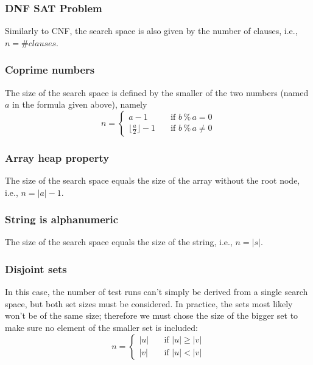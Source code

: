 \documentclass{article}
\begin{document}
\subsubsection{DNF SAT Problem}
Similarly to CNF, the search space is also given by the number of clauses, i.e., $n = \#clauses$.

\subsubsection{Coprime numbers}
The size of the search space is defined by the smaller of the two numbers (named $a$ in the formula given above), namely
\begin{equation*}
    n =
    \begin{cases}
    a - 1 & \quad \text{if } b\mathbin{\%}a = 0\\
    \lfloor \frac{a}{2} \rfloor -1 & \quad \text{if } b\mathbin{\%}a \neq 0
  \end{cases}
\end{equation*}

\subsubsection{Array heap property}
The size of the search space equals the size of the array without the root node, i.e., $n = |a| - 1$.

\subsubsection{String is alphanumeric}
The size of the search space equals the size of the string, i.e., $n = |s|$.

\subsubsection{Disjoint sets}
In this case, the number of test runs can't simply be derived from a single search space, but both set sizes must be considered. In practice, the sets most likely won't be of the same size; therefore we must chose the size of the bigger set to make sure no element of the smaller set is included:
\begin{equation*}
    n =
    \begin{cases}
    |u| & \quad \text{if } |u| \ge |v| \\
    |v| & \quad \text{if } |u| < |v|
  \end{cases}
\end{equation*}
\end{document}
